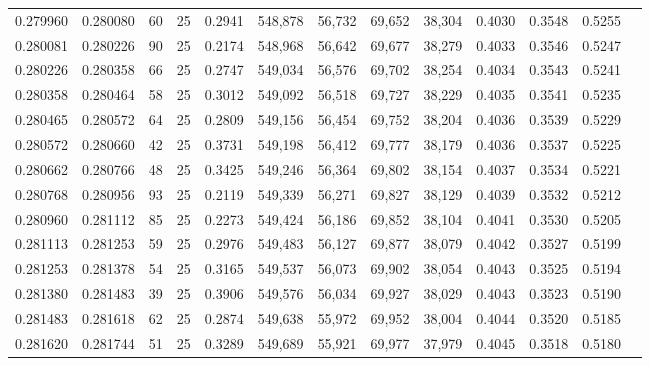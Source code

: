 \begin{tabular}{rrrrrrrrrrrrr}
0.279960 & 0.280080 &    60 &  25 &                                     0.2941 & 548,878 &  56,732 &  69,652 &  38,304 & 0.4030 & 0.3548 & 0.5255 \\
0.280081 & 0.280226 &    90 &  25 &                                     0.2174 & 548,968 &  56,642 &  69,677 &  38,279 & 0.4033 & 0.3546 & 0.5247 \\
0.280226 & 0.280358 &    66 &  25 &                                     0.2747 & 549,034 &  56,576 &  69,702 &  38,254 & 0.4034 & 0.3543 & 0.5241 \\
0.280358 & 0.280464 &    58 &  25 &                                     0.3012 & 549,092 &  56,518 &  69,727 &  38,229 & 0.4035 & 0.3541 & 0.5235 \\
0.280465 & 0.280572 &    64 &  25 &                                     0.2809 & 549,156 &  56,454 &  69,752 &  38,204 & 0.4036 & 0.3539 & 0.5229 \\
0.280572 & 0.280660 &    42 &  25 &                                     0.3731 & 549,198 &  56,412 &  69,777 &  38,179 & 0.4036 & 0.3537 & 0.5225 \\
0.280662 & 0.280766 &    48 &  25 &                                     0.3425 & 549,246 &  56,364 &  69,802 &  38,154 & 0.4037 & 0.3534 & 0.5221 \\
0.280768 & 0.280956 &    93 &  25 &                                     0.2119 & 549,339 &  56,271 &  69,827 &  38,129 & 0.4039 & 0.3532 & 0.5212 \\
0.280960 & 0.281112 &    85 &  25 &                                     0.2273 & 549,424 &  56,186 &  69,852 &  38,104 & 0.4041 & 0.3530 & 0.5205 \\
0.281113 & 0.281253 &    59 &  25 &                                     0.2976 & 549,483 &  56,127 &  69,877 &  38,079 & 0.4042 & 0.3527 & 0.5199 \\
0.281253 & 0.281378 &    54 &  25 &                                     0.3165 & 549,537 &  56,073 &  69,902 &  38,054 & 0.4043 & 0.3525 & 0.5194 \\
0.281380 & 0.281483 &    39 &  25 &                                     0.3906 & 549,576 &  56,034 &  69,927 &  38,029 & 0.4043 & 0.3523 & 0.5190 \\
0.281483 & 0.281618 &    62 &  25 &                                     0.2874 & 549,638 &  55,972 &  69,952 &  38,004 & 0.4044 & 0.3520 & 0.5185 \\
0.281620 & 0.281744 &    51 &  25 &                                     0.3289 & 549,689 &  55,921 &  69,977 &  37,979 & 0.4045 & 0.3518 & 0.5180 \\

\end{tabular}

